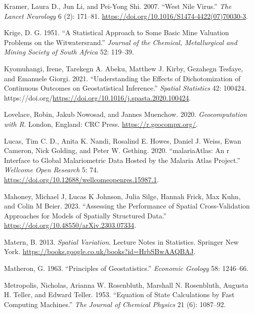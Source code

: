 \documentclass[
  letterpaper,
]{krantz}
\newlength{\cslhangindent}
\newenvironment{CSLReferences}[2] %
 {\begin{list}{}{%
  \setlength{\itemindent}{0pt}
  \setlength{\leftmargin}{0pt}
  \setlength{\parsep}{0pt}
  \ifodd #1
   \setlength{\leftmargin}{\cslhangindent}
   \setlength{\itemindent}{-1\cslhangindent}
  \fi
  \setlength{\itemsep}{#2\baselineskip}}}
 {\end{list}}
\begin{document}
\begin{CSLReferences}{1}{0}
Kramer, Laura D., Jun Li, and Pei-Yong Shi. 2007. {``West Nile Virus.''}
\emph{The Lancet Neurology} 6 (2): 171--81.
\url{https://doi.org/10.1016/S1474-4422(07)70030-3}.

Krige, D. G. 1951. {``A Statistical Approach to Some Basic Mine
Valuation Problems on the Witwatersrand.''} \emph{Journal of the
Chemical, Metallurgical and Mining Society of South Africa} 52: 119--39.

Kyomuhangi, Irene, Tarekegn A. Abeku, Matthew J. Kirby, Gezahegn
Tesfaye, and Emanuele Giorgi. 2021. {``Understanding the Effects of
Dichotomization of Continuous Outcomes on Geostatistical Inference.''}
\emph{Spatial Statistics} 42: 100424.
https://doi.org/\url{https://doi.org/10.1016/j.spasta.2020.100424}.

Lovelace, Robin, Jakub Nowosad, and Jannes Muenchow. 2020.
\emph{Geocomputation with {R}}. London, England: CRC Press.
\url{https://r.geocompx.org/}.

Lucas, Tim C. D., Anita K. Nandi, Rosalind E. Howes, Daniel J. Weiss,
Ewan Cameron, Nick Golding, and Peter W. Gething. 2020. {``malariaAtlas:
An r Interface to Global Malariometric Data Hosted by the Malaria Atlas
Project.''} \emph{Wellcome Open Research} 5: 74.
\url{https://doi.org/10.12688/wellcomeopenres.15987.1}.

Mahoney, Michael J, Lucas K Johnson, Julia Silge, Hannah Frick, Max
Kuhn, and Colin M Beier. 2023. {``Assessing the Performance of Spatial
Cross-Validation Approaches for Models of Spatially Structured Data.''}
\url{https://doi.org/10.48550/arXiv.2303.07334}.

Matern, B. 2013. \emph{Spatial Variation}. Lecture Notes in Statistics.
Springer New York.
\url{https://books.google.co.uk/books?id=HrbSBwAAQBAJ}.

Matheron, G. 1963. {``Principles of Geostatistics.''} \emph{Economic
Geology} 58: 1246--66.

Metropolis, Nicholas, Arianna W. Rosenbluth, Marshall N. Rosenbluth,
Augusta H. Teller, and Edward Teller. 1953. {``Equation of State
Calculations by Fast Computing Machines.''} \emph{The Journal of
Chemical Physics} 21 (6): 1087--92.


\end{CSLReferences}
\end{document}
